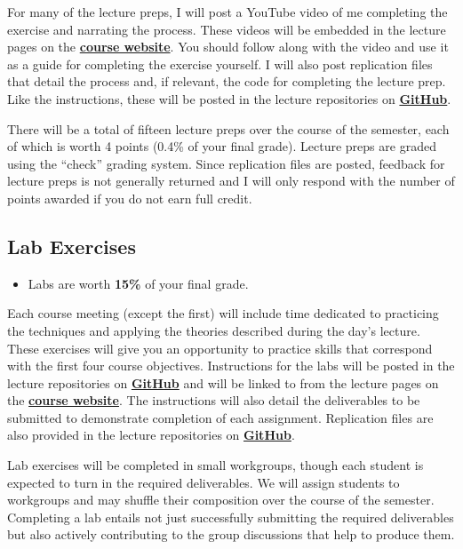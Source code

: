 \documentclass[]{book}
\newenvironment{rmdblock}[1]
  {\begin{shaded*}
  \begin{itemize}
  \renewcommand{\labelitemi}{
    \raisebox{-.7\height}[0pt][0pt]{
      {\setkeys{Gin}{width=3em,keepaspectratio}\texttt{[image: images/\#1]}}
    }
  }
  \item
  }
  {
  \end{itemize}
  \end{shaded*}
  }
\newenvironment{rmdtip}
  {\begin{rmdblock}{tip}}
  {\end{rmdblock}}
\theoremstyle{definition}
\theoremstyle{definition}
\theoremstyle{definition}
\theoremstyle{remark}
\begin{document}
For many of the lecture preps, I will post a YouTube video of me
completing the exercise and narrating the process. These videos will be
embedded in the lecture pages on the
\href{https://slu-soc5050.github.io/}{\textbf{course website}}. You
should follow along with the video and use it as a guide for completing
the exercise yourself. I will also post replication files that detail
the process and, if relevant, the code for completing the lecture prep.
Like the instructions, these will be posted in the lecture repositories
on \href{https://github.com/slu-soc5050}{\textbf{GitHub}}.

There will be a total of fifteen lecture preps over the course of the
semester, each of which is worth 4 points (0.4\% of your final grade).
Lecture preps are graded using the ``check'' grading system. Since
replication files are posted, feedback for lecture preps is not
generally returned and I will only respond with the number of points
awarded if you do not earn full credit.

\hypertarget{lab-exercises}{%
\subsection{Lab Exercises}\label{lab-exercises}}

\begin{rmdtip}
Labs are worth \textbf{15\%} of your final grade.
\end{rmdtip}

Each course meeting (except the first) will include time dedicated to
practicing the techniques and applying the theories described during the
day's lecture. These exercises will give you an opportunity to practice
skills that correspond with the first four course objectives.
Instructions for the labs will be posted in the lecture repositories on
\href{https://github.com/slu-soc5050}{\textbf{GitHub}} and will be
linked to from the lecture pages on the
\href{https://slu-soc5050.github.io/}{\textbf{course website}}. The
instructions will also detail the deliverables to be submitted to
demonstrate completion of each assignment. Replication files are also
provided in the lecture repositories on
\href{https://github.com/slu-soc5050}{\textbf{GitHub}}.

Lab exercises will be completed in small workgroups, though each student
is expected to turn in the required deliverables. We will assign
students to workgroups and may shuffle their composition over the course
of the semester. Completing a lab entails not just successfully
submitting the required deliverables but also actively contributing to
the group discussions that help to produce them.
\end{document}
